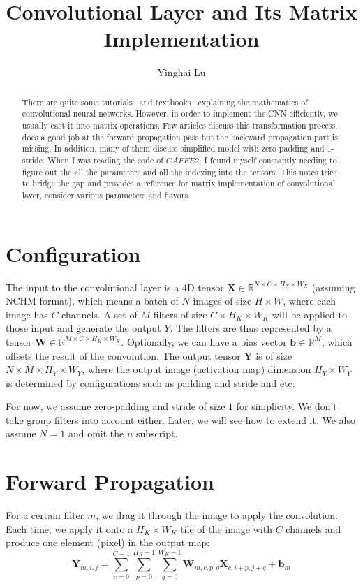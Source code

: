 \documentclass[authordraft=true,dvipsnames]{acmart}
\title{Convolutional Layer and Its Matrix Implementation}
\author{Yinghai Lu}
\newcommand{\bx}[0]{\mathbf{X}}
\newcommand{\bw}[0]{\mathbf{W}}
\newcommand{\by}[0]{\mathbf{Y}}
\begin{document}
 
\begin{abstract}
There are quite some tutorials~\cite{cs231n,andrew14,jefkin16} and textbooks~\cite{goodfellow16} explaining the mathematics of convolutional neural networks. However, in order to implement the CNN efficiently, we usually cast it into matrix operations. Few articles discuss this transformation process. \cite{cs231n} does a good job at the forward propagation pass but the backward propagation part is missing. In addition, many of them discuss simplified model with zero padding and $1$-stride. When I was reading the code of $CAFFE2$, I found myself constantly needing to figure out the all the parameters and all the indexing into the tensors. This notes tries to bridge the gap and provides a reference for matrix implementation of convolutional layer, consider various parameters and flavors. 
\end{abstract}
\maketitle

\section{Configuration}
The input to the convolutional layer is a 4D tensor $\bx \in \mathbb{R} ^{N \times C \times H_X \times W_X}$ (assuming NCHM format), which means a batch of $N$ images of size $H \times W$, where each image has $C$ channels. A set of $M$ filters of size $C \times H_K \times W_K$ will be applied to those input and generate the output $Y$. The filters are thus represented by a tensor $\bw \in \mathbb{R}^{M \times C \times H_K \times W_K}$. Optionally, we can have a bias vector $\mathbf{b} \in \mathbb{R}^{M}$, which offsets the result of the convolution. The output tensor $\by$ is of size $N \times M \times H_Y \times W_Y$, where the output image (activation map) dimension $H_Y \times W_Y$ is determined by configurations such as padding and stride and etc. 

For now, we assume zero-padding and stride of size $1$ for simplicity. We don't take group filters into account either. Later, we will see how to extend it. We also assume $N=1$ and omit the $n$ subscript. 

\section{Forward Propagation}
For a certain filter $m$, we drag it through the image to apply the convolution. Each time, we apply it onto a $H_K \times W_K$ tile of the image with $C$ channels and produce one element (pixel) in the output map:
\begin{equation} \label{forward}
\by_{m, i,j}=\sum_{c=0}^{C-1}{\sum_{p=0}^{H_K-1}{\sum_{q=0}^{W_K-1}{\bw_{m,c,p,q}\bx_{c, i+p,j+q}}}} + \mathbf{b}_m
\end{equation}
\end{document}
